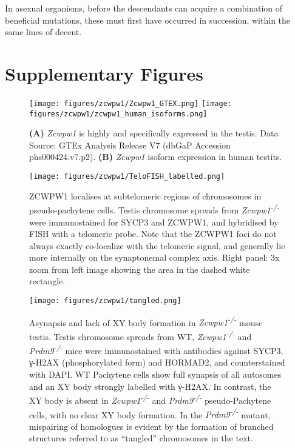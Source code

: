 \begin{savequote}[8cm]
In asexual organisms, before the descendants can acquire a combination of beneficial mutations, these must first have occurred in succession, within the same lines of decent.
\end{savequote}

\chapter{\label{app:1-A}Supplementary Figures}

\minitoc



\begin{figure}[H]
	\centering
	\texttt{[image: figures/zcwpw1/Zcwpw1\_GTEX.png]}
	\texttt{[image: figures/zcwpw1/zcwpw1\_human\_isoforms.png]}
	\caption[\textit{Zcwpw1} Tissue and Isoform expression]{
		\textbf{(A)} \textit{Zcwpw1} is highly and specifically expressed in the testis. Data Source: GTEx Analysis Release V7 (dbGaP Accession phs000424.v7.p2).
		\textbf{(B)} \textit{Zcwpw1} isoform expression in human testits.
	}
	\label{fig:isoforms}
\end{figure}


\begin{figure}[H]
	\centering
	\texttt{[image: figures/zcwpw1/TeloFISH\_labelled.png]}
	\caption[Telomeric Localisation]{
		ZCWPW1 localises at subtelomeric regions of chromosomes in pseudo-pachytene cells. Testis chromosome spreads from \textit{Zcwpw1\textsuperscript{-/-}} were immunostained for SYCP3 and ZCWPW1, and hybridised by FISH with a telomeric probe. Note that the ZCWPW1 foci do not always exactly co-localize with the telomeric signal, and generally lie more internally on the synaptonemal complex axis. Right panel: 3x zoom from left image showing the area in the dashed white rectangle.
	}
	\label{fig:telofish}
\end{figure}


\begin{figure}[H]
	\centering
	\texttt{[image: figures/zcwpw1/tangled.png]}
	\caption[Tangled Chromosome Phenotype]{
		Asynapsis and lack of XY body formation in \textit{Zcwpw1\textsuperscript{-/-}} mouse testis. Testis chromosome spreads from WT, \textit{Zcwpw1\textsuperscript{-/-}} and \textit{Prdm9\textsuperscript{-/-}} mice were immunostained with antibodies against SYCP3, γ-H2AX (phosphorylated form) and HORMAD2, and counterstained with DAPI. WT Pachytene cells show full synapsis of all autosomes and an XY body strongly labelled with γ-H2AX. In contrast, the XY body is absent in \textit{Zcwpw1\textsuperscript{-/-}} and \textit{Prdm9\textsuperscript{-/-}} pseudo-Pachytene cells, with no clear XY body formation. In the \textit{Prdm9\textsuperscript{-/-}} mutant, mispairing of homologues is evident by the formation of branched structures referred to as “tangled” chromosomes in the text.
	}
	\label{fig:tangled}
\end{figure}


